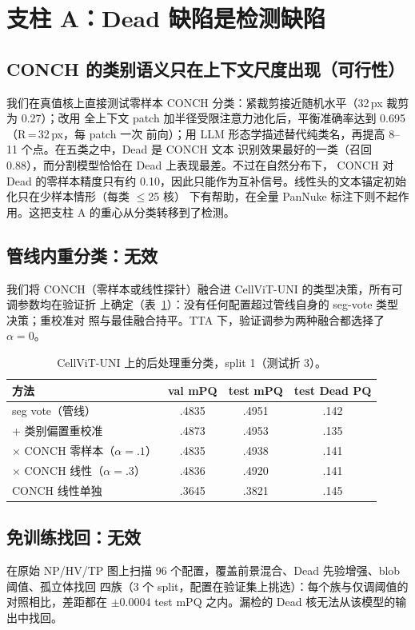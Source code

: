 \documentclass[11pt]{article}
\begin{document}
\section{支柱 A：Dead 缺陷是检测缺陷}
\label{sec:pillarA}

\subsection{CONCH 的类别语义只在上下文尺度出现（可行性）}
我们在真值核上直接测试零样本 CONCH 分类：紧裁剪接近随机水平（32\,px 裁剪为 0.27）；改用
全上下文 patch 加半径受限注意力池化后，平衡准确率达到 0.695（R\,=\,32\,px，每 patch 一次
前向）；用 LLM 形态学描述替代纯类名，再提高 8--11 个点。在五类之中，Dead 是 CONCH 文本
识别效果最好的一类（召回 0.88），而分割模型恰恰在 Dead 上表现最差。不过在自然分布下，
CONCH 对 Dead 的零样本精度只有约 0.10，因此只能作为互补信号。线性头的文本锚定初始化只在少样本情形（每类 $\le$25 核）
下有帮助，在全量 PanNuke 标注下则不起作用。这把支柱 A 的重心从分类转移到了检测。

\subsection{管线内重分类：无效}
我们将 CONCH（零样本或线性探针）融合进 CellViT-UNI 的类型决策，所有可调参数均在验证折
上确定（表~\ref{tab:retype}）：没有任何配置超过管线自身的 seg-vote 类型决策；重校准对
照与最佳融合持平。TTA 下，验证调参为两种融合都选择了 $\alpha=0$。

\begin{table}[t]
\centering\small
\caption{CellViT-UNI 上的后处理重分类，split 1（测试折 3）。}
\label{tab:retype}
\begin{tabular}{lccc}
\toprule
方法 & val mPQ & test mPQ & test Dead PQ \\
\midrule
seg vote（管线）                 & .4835 & .4951 & .142 \\
+ 类别偏置重校准                 & .4873 & .4953 & .135 \\
$\times$ CONCH 零样本（$\alpha{=}.1$） & .4835 & .4938 & .141 \\
$\times$ CONCH 线性（$\alpha{=}.3$）    & .4836 & .4920 & .141 \\
CONCH 线性单独                   & .3645 & .3821 & .145 \\
\bottomrule
\end{tabular}
\end{table}

\subsection{免训练找回：无效}
在原始 NP/HV/TP 图上扫描 96 个配置，覆盖前景混合、Dead 先验增强、blob 阈值、孤立体找回
四族（3 个 split，配置在验证集上挑选）：每个族与仅调阈值的对照相比，差距都在
$\pm0.0004$ test mPQ 之内。漏检的 Dead 核无法从该模型的输出中找回。
\end{document}
